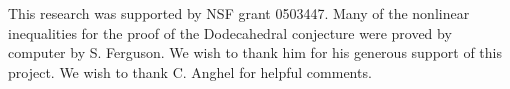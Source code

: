 \documentclass{article} %
\begin{document}
This research was supported by NSF grant 0503447. Many of the
nonlinear inequalities for the proof of the Dodecahedral conjecture
were proved by computer by S. Ferguson. We wish to thank him for his
generous support of this project. We wish to thank C. Anghel for
helpful comments.





\end{document}
